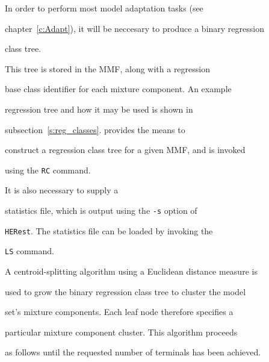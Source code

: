 In order to perform most model adaptation tasks (see


chapter~\ref{c:Adapt}), it will be neccesary to produce a binary regression


class tree. 


This tree is stored in the MMF, along with a regression


base class identifier for each mixture component. An example


regression tree and how it may be used is shown in


subsection~\ref{s:reg_classes}.  provides the means to


construct a regression class tree for a given MMF, and is invoked


using the \texttt{RC} command. 


It is also necessary to supply a


statistics file, which is output using the \texttt{-s} option of


\texttt{HERest}. The statistics file can be loaded by invoking the


\texttt{LS} command.





A centroid-splitting algorithm using a Euclidean distance measure is


used to grow the binary regression class tree to cluster the model


set's  mixture components.  Each leaf node therefore specifies a 


particular mixture component cluster. This algorithm proceeds


as follows until the requested number of terminals has been achieved.


